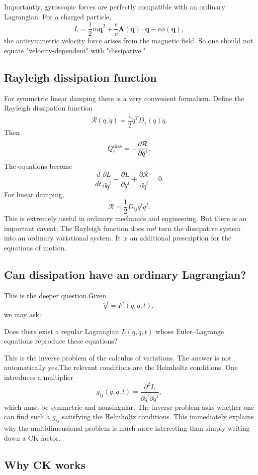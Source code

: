 Importantly, gyroscopic forces are perfectly compatible with an ordinary Lagrangian. For a charged particle,
$$ L= \frac12m\dot{\mathbf q}^2 +\frac{e}{c}\mathbf A(\mathbf q)\cdot\dot{\mathbf q} -e\phi(\mathbf q), $$
the antisymmetric velocity force arises from the magnetic field.
So one should not equate "velocity-dependent" with "dissipative."

\subsection{Rayleigh dissipation function}

For symmetric linear damping there is a very convenient formalism.
Define the Rayleigh dissipation function
$$ \boxed{ \mathcal R(q,\dot q) = \frac12\dot q^T D_s(q)\dot q. } $$
Then
$$ Q_i^{\rm diss} = -\frac{\partial\mathcal R}{\partial\dot q^i}. $$
The equations become
$$ \boxed{ \frac{d}{dt}\frac{\partial L}{\partial\dot q^i} - \frac{\partial L}{\partial q^i} + \frac{\partial\mathcal R}{\partial\dot q^i} =0. } $$
For linear damping,
$$ \mathcal R = \frac12D_{ij}\dot q^i\dot q^j. $$
This is extremely useful in ordinary mechanics and engineering.
But there is an important caveat:
The Rayleigh function does \emph{not} turn the dissipative system into an ordinary variational system.
It is an additional prescription for the equations of motion.

\subsection{Can dissipation have an ordinary Lagrangian?}

This is the deeper question.Given $$ \ddot q^i=F^i(q,\dot q,t), $$
we may ask:

Does there exist a regular Lagrangian \(L(q,\dot q,t)\) whose Euler–Lagrange equations reproduce these equations?

This is the inverse problem of the calculus of variations.
The answer is not automatically yes.The relevant conditions are the Helmholtz conditions.
One introduces a multiplier
$$ g_{ij}(q,\dot q,t) = \frac{\partial^2L}{\partial\dot q^i\partial\dot q^j}, $$
which must be symmetric and nonsingular.
The inverse problem asks whether one can find such a \(g_{ij}\) satisfying the Helmholtz conditions.
This immediately explains why the multidimensional problem is much more interesting than simply writing down a CK factor.

\subsection{ Why CK works}

